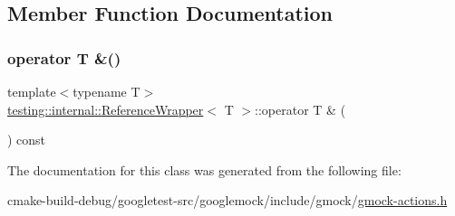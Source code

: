 \subsection{Member Function Documentation}
\mbox{\label{classtesting_1_1internal_1_1ReferenceWrapper_a90ff0f93425244ca7f9cbd1d46017e80}} 
\subsubsection{\texorpdfstring{operator T \&()}{operator T \&()}}
{\footnotesize\ttfamily template$<$typename T$>$ \\
\mbox{\hyperlink{classtesting_1_1internal_1_1ReferenceWrapper}{testing\+::internal\+::\+Reference\+Wrapper}}$<$ T $>$\+::operator T \& (\begin{DoxyParamCaption}{ }\end{DoxyParamCaption}) const\hspace{0.3cm}{\ttfamily [inline]}}



The documentation for this class was generated from the following file\+:\begin{DoxyCompactItemize}
\item 
cmake-\/build-\/debug/googletest-\/src/googlemock/include/gmock/\mbox{\hyperlink{gmock-actions_8h}{gmock-\/actions.\+h}}\end{DoxyCompactItemize}
